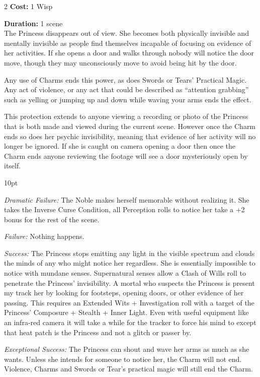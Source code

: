 \begin{multicols}{2}
\noindent \textbf{Cost:} 1 Wisp

\noindent \textbf{Duration:} 1 scene \\

\noindent The Princess disappears out of view. She becomes both physically invisible and mentally invisible as people find themselves incapable of focusing on evidence of her activities. If she opens a door and walks through nobody will notice the door move, though they may unconsciously move to avoid being hit by the door. 

Any use of Charms ends this power, as does Swords or Tears' Practical Magic. Any act of violence, or any act that could be described as \textquotedblleft attention grabbing\textquotedblright\, such as yelling or jumping up and down while waving your arms ends the effect. 

This protection extends to anyone viewing a recording or photo of the Princess that is both made and viewed during the current scene. However once the Charm ends so does her psychic invisibility, meaning that evidence of her activity will no longer be ignored. If she is caught on camera opening a door then once the Charm ends anyone reviewing the footage will see a door mysteriously open by itself. 

\begin{myindentpar}{10pt}

\emph{Dramatic Failure:} The Noble makes herself memorable without realizing it. She takes the Inverse Curse Condition, all Perception rolls to notice her take a +2 bonus for the rest of the scene.

\emph{Failure:} Nothing happens. 

\emph{Success:} The Princess stops emitting any light in the visible spectrum and clouds the minds of any who might notice her regardless. She is essentially impossible to notice with mundane senses. Supernatural senses allow a Clash of Wills roll to penetrate the Princess' invisibility. A mortal who suspects the Princess is present my track her by looking for footsteps, opening doors, or other evidence of her passing. This requires an Extended Wits + Investigation roll with a target of the Princess' Composure + Stealth + Inner Light. Even with useful equipment like an infra-red camera it will take a while for the tracker to force his mind to except that heat patch is the Princess and not a glitch or passer by. 

\emph{Exceptional Success:} The Princess can shout and wave her arms as much as she wants. Unless she intends for someone to notice her, the Charm will not end. Violence, Charms and Swords or Tear's practical magic will still end the Charm. 


\end{myindentpar}
\end{multicols}
